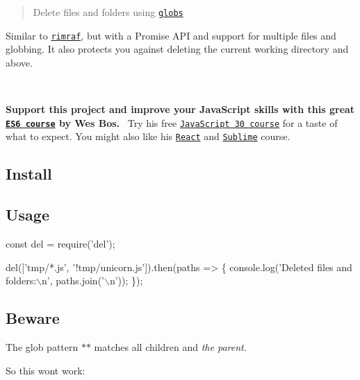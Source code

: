 \begin{quote}
Delete files and folders using \href{https://github.com/isaacs/minimatch#usage}{\tt globs} \end{quote}


Similar to \href{https://github.com/isaacs/rimraf}{\tt rimraf}, but with a Promise A\+PI and support for multiple files and globbing. It also protects you against deleting the current working directory and above. 



🐶

{\bfseries Support this project and improve your Java\+Script skills with this great \href{https://ES6.io/friend/AWESOME}{\tt E\+S6 course} by Wes Bos.}~\newline
Try his free \href{https://javascript30.com/friend/AWESOME}{\tt Java\+Script 30 course} for a taste of what to expect. You might also like his \href{https://ReactForBeginners.com/friend/AWESOME}{\tt React} and \href{https://SublimeTextBook.com/friend/AWESOME}{\tt Sublime} course.





\subsection*{Install}




\subsection*{Usage}


\begin{DoxyCode}
const del = require('del');

del(['tmp/*.js', '!tmp/unicorn.js']).then(paths => \{
    console.log('Deleted files and folders:\(\backslash\)n', paths.join('\(\backslash\)n'));
\});
\end{DoxyCode}


\subsection*{Beware}

The glob pattern {\ttfamily $\ast$$\ast$} matches all children and {\itshape the parent}.

So this won\textquotesingle{}t work\+:


